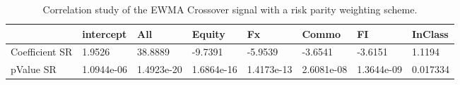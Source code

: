 \begin{table}[H]
\centering
\begin{tabular}{llllllll}
& intercept & All & Equity & Fx & Commo & FI & InClass \\ 
\hline 
Coefficient SR & 1.9526 & 38.8889 & -9.7391 & -5.9539 & -3.6541 & -3.6151 & 1.1194 \\ 
pValue SR & 1.0944e-06 & 1.4923e-20 & 1.6864e-16 & 1.4173e-13 & 2.6081e-08 & 1.3644e-09 & 0.017334 \\ 
\hline
\end{tabular}
\caption{Correlation study of the EWMA Crossover signal with a risk parity weighting scheme.}
\label{MBBSRPNR_CORR}
\end{table}